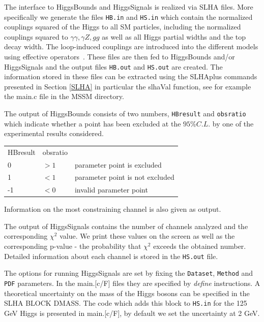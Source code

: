 \documentclass[12pt,a4paper]{article}
\begin{document}
The interface to HiggsBounds and HiggsSignals  is realized via  SLHA files.  More specifically
we generate  the files 
\verb|HB.in| and \verb|HS.in| which  contain  
the normalized  couplings squared of the Higgs to all SM particles,
including the normalized couplings squared to  $\gamma\gamma,\gamma Z, gg$  as well as all Higgs partial widths and the  top decay width.
The loop-induced couplings are introduced into the different models using effective operators~\cite{Belanger:2013oya,Belyaev:2012qa}.
These  files are then  fed to HiggsBounds and/or HiggsSignals  
and the output files \verb|HB.out| and \verb|HS.out| are created. The information
stored in these files can be extracted using the SLHAplus commands presented in
Section \ref{SLHA} in particular the slhaVal function, see for example the main.c file in the MSSM directory. 

The output of HiggsBounds consists of two numbers, \verb|HBresult| and \verb|obsratio| which indicate whether a point has been excluded at the $95\%C.L.$ by one of the experimental results considered. 

\begin{tabular}{lll}
HBresult&obsratio&\\
0& $>1$ & parameter point is excluded\\
1& $<1$ & parameter point is not excluded\\
-1& $<0$ & invalid parameter point\\
\end{tabular}

\noindent
Information on the most constraining channel is also given as output.

The output of HiggsSignals contains the number of  channels analyzed  and the
corresponding  $\chi^2$ value. We print these values on the screen as well
as the corresponding p-value - the probability that  $\chi^2$ exceeds the
obtained number. Detailed information about each  channel is stored in the
\verb|HS.out| file. 

The options for running HiggsSignals  are set by  fixing the  \verb|Dataset|, \verb|Method| and
\verb|PDF| parameters. In the main.[c/F] files they are specified by {\it define}
instructions.
A theoretical uncertainty  on the  mass of the Higgs bosons can be specified in the SLHA BLOCK DMASS. 
The code which adds this block to \verb|HS.in| for the 125 GeV Higgs is presented in main.[c/F],  by default we set the uncertainty at  2 GeV. 
\end{document}
